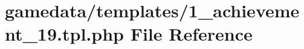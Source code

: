 \hypertarget{1__achievement__19_8tpl_8php}{\section{gamedata/templates/1\+\_\+achievement\+\_\+19.tpl.\+php File Reference}
\label{1__achievement__19_8tpl_8php}
}
